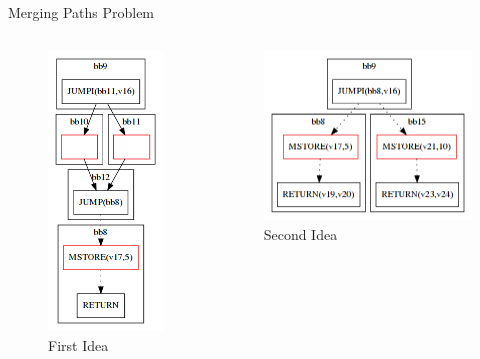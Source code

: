 \documentclass[11pt]{beamer}
\begin{document}
\begin{frame}{Merging Paths Problem}
\begin{columns}
\begin{figure}
    \includegraphics[scale=0.25]{figures/cfg_withEmpty.png}
    \caption{First Idea}
\end{figure}
\begin{figure}
    \centering
    \includegraphics[scale=0.25]{figures/cfg_abstract.png}
    \caption{Second Idea}
\end{figure}
\end{columns}
\end{frame}
\end{document}
